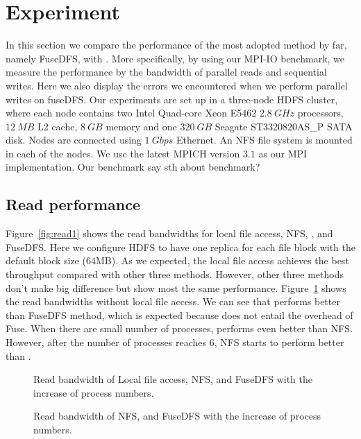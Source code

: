 \section{Experiment}
\label{sec:exp}

In this section we compare the performance of the most adopted method by far,
namely FuseDFS, with {\proj}. More specifically, by using our MPI-IO benchmark,
we measure the performance by the bandwidth of parallel reads and sequential
writes. Here we also display the errors we encountered when we perform parallel
writes on fuseDFS. Our experiments are set up in a three-node HDFS cluster,
where each node contains two Intel Quad-core Xeon E5462 $2.8~GHz$ processors,
$12~MB$ L2 cache, $8~GB$ memory and one $320~GB$ Seagate ST3320820AS\_P SATA
disk. Nodes are connected using $1~Gbps$ Ethernet. An NFS file system is mounted
in each of the nodes. We use the latest MPICH
version $3.1$ as our MPI implementation. Our benchmark {\color{red} say sth
about benchmark?}

\subsection{Read performance}
Figure~\ref{fig:read1} shows the read bandwidths for local file access, NFS, {\proj},
and FuseDFS. Here we configure HDFS to have one replica for each file block with
the default block size (64MB). As we expected, the local file access achieves
the best throughput compared with other three methods. However, other three
methods don't make big difference but show most the same performance.
Figure~\ref{fig:read2} shows the read bandwidths without local file access. We
can see that {\proj} performs better than FuseDFS method, which is expected
because {\proj} does not entail the overhead of Fuse. When there are small
number of processes, {\proj} performs even better than NFS. However, after the
number of processes reaches 6, NFS starts to perform better than {\proj}.

\begin{figure}[t]
\begin{minipage}{3in}
\begin{center}
\caption{\small Read bandwidth of Local file access, NFS, {\proj} and FuseDFS
with the increase of process numbers.}
\label{fig:read1}
\vspace{-6pt}
\end{center}
\end{minipage}
\hspace{0.02in}
\begin{minipage}{3in}
\begin{center}
\caption{\small Read bandwidth of NFS, {\proj} and FuseDFS
with the increase of process numbers.}
\label{fig:read2}
\vspace{-6pt}
\end{center}
\end{minipage}
\end{figure}
